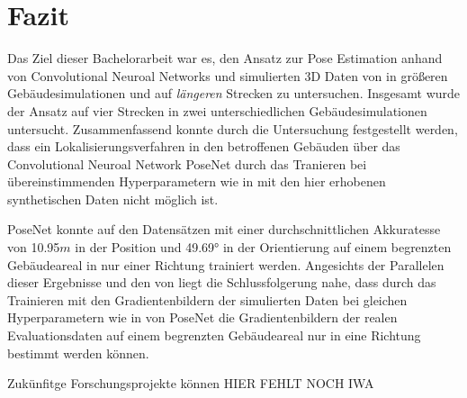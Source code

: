 
\section{Fazit}
\label{sec:kapitel_6}
Das Ziel dieser Bachelorarbeit war es, den Ansatz zur Pose Estimation anhand von Convolutional Neuroal Networks und simulierten 3D Daten von \citet{acharyaBIMPoseNetIndoorCamera2019} in größeren Gebäudesimulationen und auf \textit{längeren} Strecken zu untersuchen.
Insgesamt wurde der Ansatz auf vier Strecken in zwei unterschiedlichen Gebäudesimulationen untersucht. Zusammenfassend konnte durch die Untersuchung festgestellt werden, dass ein Lokalisierungsverfahren in den betroffenen Gebäuden über das Convolutional Neuroal Network PoseNet durch das Tranieren bei übereinstimmenden Hyperparametern wie in \cite{acharyaBIMPoseNetIndoorCamera2019} mit den hier erhobenen synthetischen Daten nicht möglich ist. 

PoseNet konnte auf den Datensätzen mit einer durchschnittlichen Akkuratesse von 10.95$m$ in der Position und 49.69° in der Orientierung auf einem begrenzten Gebäudeareal in nur einer Richtung trainiert werden. Angesichts der Parallelen dieser Ergebnisse und den von \citet{acharyaBIMPoseNetIndoorCamera2019} liegt die Schlussfolgerung nahe, dass durch das Trainieren mit den Gradientenbildern der simulierten Daten bei gleichen Hyperparametern wie in \cite{acharyaBIMPoseNetIndoorCamera2019} von PoseNet die Gradientenbildern der realen Evaluationsdaten auf einem begrenzten Gebäudeareal nur in eine Richtung bestimmt werden können.

Zukünfitge Forschungsprojekte können
HIER FEHLT NOCH IWA